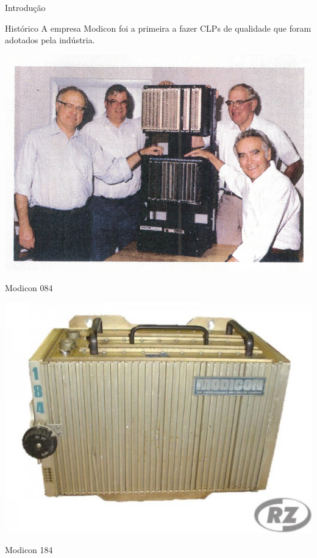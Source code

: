 \begin{frame}{Introdução}
	\begin{block}{Histórico}
		A empresa Modicon foi a primeira a fazer CLPs de qualidade que foram adotados pela indústria.
	\end{block}
	
	\begin{minipage}{0.48\linewidth}
		\centering
		\includegraphics[width=1\linewidth]{Figuras/Ch08/fig5}
		
		\vspace{0.3cm}
		
		Modicon 084
	\end{minipage}
	\hfill
	\begin{minipage}{0.48\linewidth}
		\centering
		\includegraphics[width=1\linewidth]{Figuras/Ch08/fig6}
		
		Modicon 184
	\end{minipage}
\end{frame}


